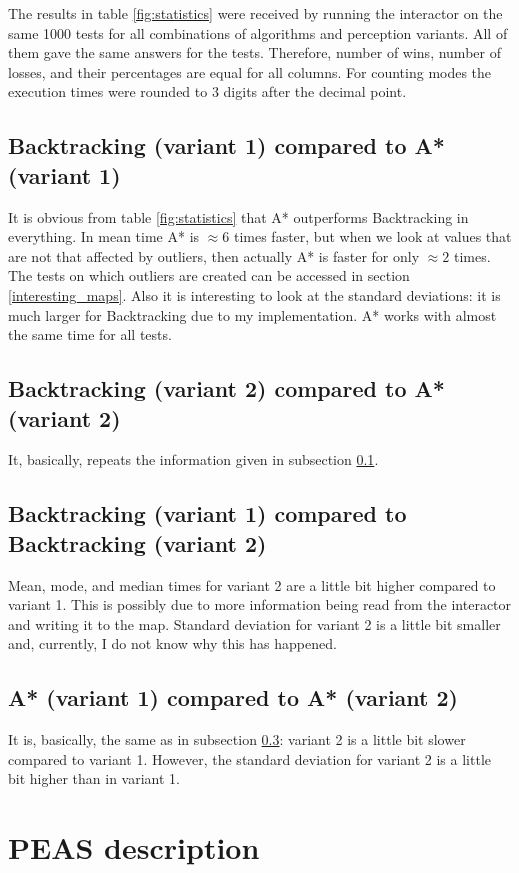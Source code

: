\documentclass{article}
\begin{document}
The results in table \ref{fig:statistics} were received by running the interactor on the same 1000 tests for all combinations of algorithms and perception variants.
All of them gave the same answers for the tests.
Therefore, number of wins, number of losses, and their percentages are equal for all columns.
For counting modes the execution times were rounded to 3 digits after the decimal point.

\subsection{Backtracking (variant 1) compared to A* (variant 1)} \label{backtracking_1_vs_a_star_1}
It is obvious from table \ref{fig:statistics} that A* outperforms Backtracking in everything.
In mean time A* is $\approx 6$ times faster, but when we look at values that are not that affected by outliers, then actually A* is faster for only $\approx 2$ times.
The tests on which outliers are created can be accessed in section \ref{interesting_maps}.
Also it is interesting to look at the standard deviations: it is much larger for Backtracking due to my implementation. A* works with almost the same time for all tests.
\subsection{Backtracking (variant 2) compared to A* (variant 2)}
It, basically, repeats the information given in subsection \ref{backtracking_1_vs_a_star_1}.
\subsection{Backtracking (variant 1) compared to Backtracking (variant 2)} \label{backtracking_1_vs_backtracking_2}
Mean, mode, and median times for variant 2 are a little bit higher compared to variant 1. This is possibly due to more information being read from the interactor and writing it to the map.
Standard deviation for variant 2 is a little bit smaller and, currently, I do not know why this has happened.
\subsection{A* (variant 1) compared to A* (variant 2)}
It is, basically, the same as in subsection \ref{backtracking_1_vs_backtracking_2}: variant 2 is a little bit slower compared to variant 1. However, the standard deviation for variant 2 is a little bit higher than in variant 1.
\section{PEAS description}
\end{document}
